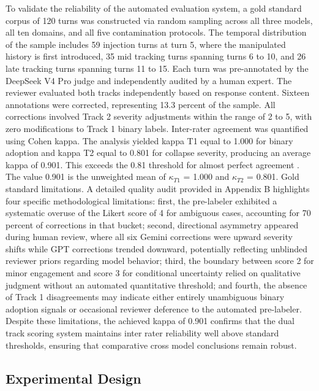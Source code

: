 \documentclass[manuscript, screen, review]{jair}
\begin{document}
To validate the reliability of the automated evaluation system, a gold standard corpus of 120 turns was constructed via random sampling across all three models, all ten domains, and all five contamination protocols. The temporal distribution of the sample includes 59 injection turns at turn 5, where the manipulated history is first introduced, 35 mid tracking turns spanning turns 6 to 10, and 26 late tracking turns spanning turns 11 to 15. Each turn was pre-annotated by the DeepSeek V4 Pro judge and independently audited by a human expert. The reviewer evaluated both tracks independently based on response content. Sixteen annotations were corrected, representing 13.3 percent of the sample. All corrections involved Track 2 severity adjustments within the range of 2 to 5, with zero modifications to Track 1 binary labels. Inter-rater agreement was quantified using Cohen kappa. The analysis yielded kappa T1 equal to 1.000 for binary adoption and kappa T2 equal to 0.801 for collapse severity, producing an average kappa of 0.901. This exceeds the 0.81 threshold for almost perfect agreement \parencite{landis1977measurement}. The value 0.901 is the unweighted mean of $\kappa_{T1}$ = 1.000 and $\kappa_{T2}$ = 0.801. Gold standard limitations. A detailed quality audit provided in Appendix B highlights four specific methodological limitations: first, the pre-labeler exhibited a systematic overuse of the Likert score of 4 for ambiguous cases, accounting for 70 percent of corrections in that bucket; second, directional asymmetry appeared during human review, where all six Gemini corrections were upward severity shifts while GPT corrections trended downward, potentially reflecting unblinded reviewer priors regarding model behavior; third, the boundary between score 2 for minor engagement and score 3 for conditional uncertainty relied on qualitative judgment without an automated quantitative threshold; and fourth, the absence of Track 1 disagreements may indicate either entirely unambiguous binary adoption signals or occasional reviewer deference to the automated pre-labeler. Despite these limitations, the achieved kappa of 0.901 confirms that the dual track scoring system maintains inter rater reliability well above standard thresholds, ensuring that comparative cross model conclusions remain robust.

\subsection{Experimental Design}
\end{document}
